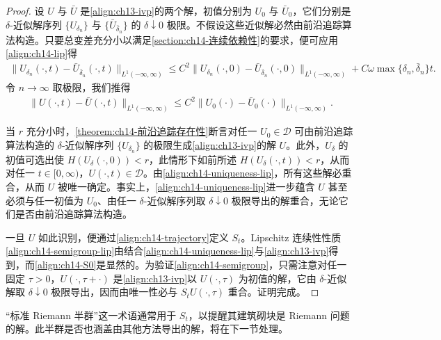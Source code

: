 \documentclass[../../main.tex]{subfiles}
\begin{document}
\begin{proof}
设 $U$ 与 $\bar U$ 是\eqref{align:ch13-ivp}的两个解，初值分别为 $U_0$ 与 $\bar U_0$，它们分别是 $\delta$-近似解序列 $\{U_{\delta_n}\}$ 与 $\{\bar U_{\bar\delta_n}\}$ 的 $\delta\downarrow0$ 极限。不假设这些近似解必然由前沿追踪算法构造。只要总变差充分小以满足\cref{section:ch14-连续依赖性}的要求，便可应用\eqref{align:ch14-lip}得
\begin{align}
\|U_{\delta_n}(\cdot,t)-\bar U_{\bar\delta_n}(\cdot,t)\|_{L^1(-\infty,\infty)}\leqslant C^2\|U_{\delta_n}(\cdot,0)-\bar U_{\bar\delta_n}(\cdot,0)\|_{L^1(-\infty,\infty)}+C\omega\max\{\delta_n,\bar\delta_n\}t.
\label{align:ch14-proof-lip}
\end{align}
令 $n\to\infty$ 取极限，我们推得
\begin{align}
\|U(\cdot,t)-\bar U(\cdot,t)\|_{L^1(-\infty,\infty)}\leqslant C^2\|U_0(\cdot)-\bar U_0(\cdot)\|_{L^1(-\infty,\infty)}.
\label{align:ch14-uniqueness-lip}
\end{align}



当 $r$ 充分小时，\cref{theorem:ch14-前沿追踪存在性}断言对任一 $U_0\in\mathscr{D}$ 可由前沿追踪算法构造的 $\delta$-近似解序列 $\{U_{\delta_n}\}$ 的极限生成\eqref{align:ch13-ivp}的解 $U$。此外，$U_\delta$ 的初值可选出使 $H(U_\delta(\cdot,0))<r$，此情形下如前所述 $H(U_\delta(\cdot,t))<r$，从而对任一 $t\in[0,\infty)$，$U(\cdot,t)\in\mathscr{D}$。由\eqref{align:ch14-uniqueness-lip}，所有这些解必重合，从而 $U$ 被唯一确定。事实上，\eqref{align:ch14-uniqueness-lip}进一步蕴含 $U$ 甚至必须与任一初值为 $U_0$、由任一 $\delta$-近似解序列取 $\delta\downarrow0$ 极限导出的解重合，无论它们是否由前沿追踪算法构造。

一旦 $U$ 如此识别，便通过\eqref{align:ch14-trajectory}定义 $S_t$。Lipschitz 连续性性质\eqref{align:ch14-semigroup-lip}由结合\eqref{align:ch14-uniqueness-lip}与\eqref{align:ch13-ivp}得到，而\eqref{align:ch14-S0}是显然的。为验证\eqref{align:ch14-semigroup}，只需注意对任一固定 $\tau>0$，$U(\cdot,\tau+\cdot)$ 是\eqref{align:ch13-ivp}以 $U(\cdot,\tau)$ 为初值的解，它由 $\delta$-近似解取 $\delta\downarrow0$ 极限导出，因而由唯一性必与 $S_tU(\cdot,\tau)$ 重合。证明完成。
\end{proof}



``标准 Riemann 半群''这一术语通常用于 $S_t$，以提醒其建筑砌块是 Riemann 问题的解。此半群是否也涵盖由其他方法导出的解，将在下一节处理。
\end{document}
